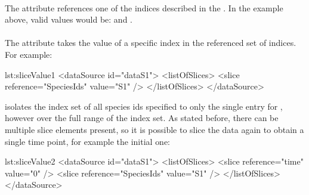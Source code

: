 

\paragraph*{}
\label{sec:sliceReference}
The  attribute references one of the indices described in the \hyperref[sec:dimensionDescription]{}. In the example above, valid values would be:  and .

\paragraph*{}
\label{sec:sliceValue}
The  attribute takes the value of a specific index in the referenced set of indices. For example:

\begin{myXmlLst}{}{lst:sliceValue1}
<dataSource id="dataS1">
	<listOfSlices>
		<slice reference="SpeciesIds" value="S1" />
	</listOfSlices>
</dataSource>
\end{myXmlLst} 

isolates the index set of all species ids specified to only the single entry for , however over the full range of the  index set. As stated before, there can be multiple slice elements present, so it is possible to slice the data again to obtain a single time point, for example the initial one:

\begin{myXmlLst}{}{lst:sliceValue2}
<dataSource id="dataS1">
	<listOfSlices>
		<slice reference="time" value="0" />
		<slice reference="SpeciesIds" value="S1" />
	</listOfSlices>
</dataSource>
\end{myXmlLst} 

